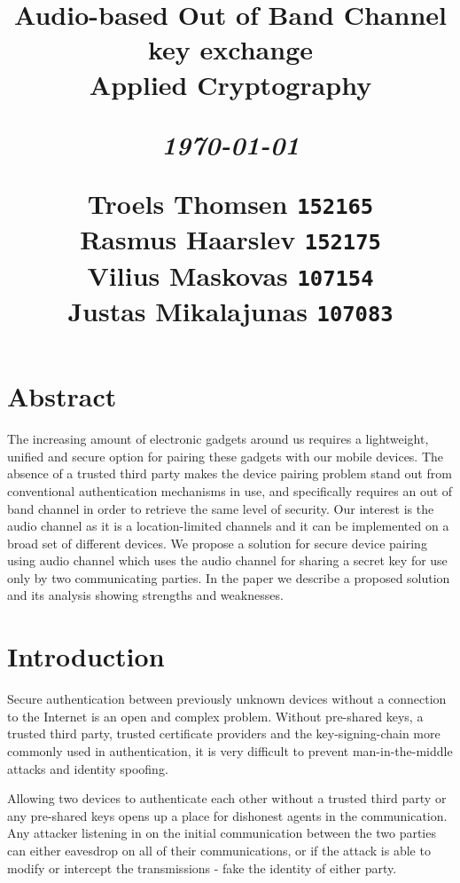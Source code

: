 \documentclass[12pt]{article}
\title{
  \vspace{4cm}
  \begin{flushleft}
  \Large{\textbf{Audio-based Out of Band Channel key exchange}} \\
  \large{Applied Cryptography}
  \end{flushleft}
  \vspace{0cm}
  \begin{flushleft}
  \small
  \textit{\today}
  \end{flushleft}
  \vspace{12cm}
  \begin{flushleft}
  \small
  Troels Thomsen \texttt{152165} \\
  Rasmus Haarslev \texttt{152175} \\
  Vilius Maskovas \texttt{107154} \\
  Justas Mikalajunas \texttt{107083}\\
  \end{flushleft}
}
\date{
}
\begin{document}
\clearpage
{}
\thispagestyle{empty}
\maketitle

\newpage

\section*{Abstract}
\label{sec:Abstract}
The increasing amount of electronic gadgets around us requires a lightweight, unified and secure option for pairing these gadgets with our mobile devices. The absence of a trusted third party makes the device pairing problem stand out from conventional authentication mechanisms in use, and specifically requires an out of band channel in order to retrieve the same level of security. Our interest is the audio channel as it is a location-limited channels and it can be implemented on a broad set of different devices.
We propose a solution for secure device pairing using audio channel which uses the audio channel for sharing a secret key for use only by two communicating parties. In the paper we describe a proposed solution and its analysis showing strengths and weaknesses.

\newpage

\tableofcontents

\newpage


\section{Introduction}
\label{sec:Introduction}

Secure authentication between previously unknown devices without a connection to the Internet is an open and complex problem. Without pre-shared keys, a trusted third party, trusted certificate providers and the key-signing-chain more commonly used in authentication, it is very difficult to prevent man-in-the-middle attacks and identity spoofing.

Allowing two devices to authenticate each other without a trusted third party or any pre-shared keys opens up a place for dishonest agents in the communication. Any attacker listening in on the initial communication between the two parties can either eavesdrop on all of their communications, or if the attack is able to modify or intercept the transmissions - fake the identity of either party.
\end{document}

